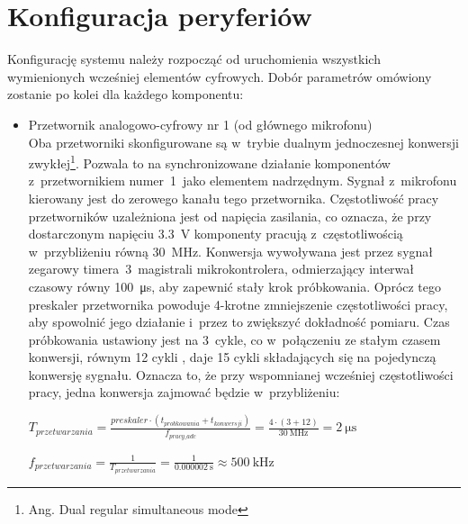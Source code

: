 \section{Konfiguracja peryferiów}
\label{sec:configuration}
Konfigurację systemu należy rozpocząć od uruchomienia wszystkich wymienionych wcześniej elementów cyfrowych. Dobór parametrów omówiony zostanie po kolei dla każdego komponentu:
\begin{itemize}
	\item Przetwornik analogowo-cyfrowy nr 1 (od głównego mikrofonu)\\
	Oba przetworniki skonfigurowane są w~trybie dualnym jednoczesnej konwersji zwykłej\footnote{Ang. Dual regular simultaneous mode}. Pozwala to na synchronizowane działanie komponentów z~przetwornikiem numer~1~jako elementem nadrzędnym. Sygnał z~mikrofonu kierowany jest do zerowego kanału tego przetwornika. Częstotliwość pracy przetworników uzależniona jest od napięcia zasilania, co oznacza, że przy dostarczonym napięciu \SI{3.3}{\V} komponenty pracują z~częstotliwością w~przybliżeniu równą \SI{30}{\MHz}. Konwersja wywoływana jest przez sygnał zegarowy timera~3~magistrali mikrokontrolera, odmierzający interwał czasowy równy \SI{100}{\micro\s}, aby zapewnić stały krok próbkowania. Oprócz tego preskaler przetwornika powoduje 4-krotne zmniejszenie częstotliwości pracy, aby spowolnić jego działanie i~przez to zwiększyć dokładność pomiaru. Czas próbkowania ustawiony jest na 3~cykle, co w~połączeniu ze stałym czasem konwersji, równym 12 cykli \cite{RM0390}, daje 15 cykli składających się na pojedynczą konwersję sygnału. Oznacza to, że przy wspomnianej wcześniej częstotliwości pracy, jedna konwersja zajmować będzie w~przybliżeniu:
		
\begin{center}
		$ T_{przetwarzania} = \frac{preskaler \cdot (t_{probkowania} + t_{konwersji})}{f_{pracy\_adc}} = \frac{4\cdot(3+12)}{\SI{30}{\MHz}} = \SI{2}{\micro\s} $
	
	$ f_{przetwarzania} = \frac{1}{T_{przetwarzania}} = \frac{1}{\SI{0.000002}{\s}} \approx \SI{500}{\kHz} $ 
	

\end{center}
\end{itemize}
